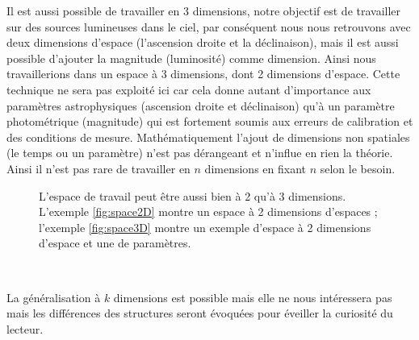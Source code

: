 Il est aussi possible de travailler en 3 dimensions, notre objectif est de travailler sur des sources lumineuses dans le ciel, par conséquent nous nous retrouvons avec deux dimensions d'espace (l'ascension droite et la déclinaison), mais il est aussi possible d'ajouter la magnitude (luminosité) comme dimension. Ainsi nous travaillerions dans un espace à 3 dimensions, dont 2 dimensions d'espace. Cette technique ne sera pas exploité ici car cela donne autant d'importance aux paramètres astrophysiques (ascension droite et déclinaison) qu'à un paramètre photométrique (magnitude) qui est fortement soumis aux erreurs de calibration et des conditions de mesure. Mathématiquement l'ajout de dimensions non spatiales (le temps ou un paramètre) n'est pas dérangeant et n'influe en rien la théorie. Ainsi il n'est pas rare de travailler en $n$ dimensions en fixant $n$ selon le besoin.

	\begin{figure}[h]
		\centering
		\hspace{5pt}
		\caption[Espace de travail à 2 ou 3 dimensions]{L'espace de travail peut être aussi bien à 2 qu'à 3 dimensions. L'exemple \ref{fig:space2D} montre un espace à 2 dimensions d'espaces ; l'exemple \ref{fig:space3D} montre un exemple d'espace à 2 dimensions d'espace et une de paramètres.}
		\label{fig:algoparsec}
	\end{figure}

\

La généralisation à $k$ dimensions est possible mais elle ne nous intéressera pas mais les différences des structures seront évoquées pour éveiller la curiosité du lecteur.

